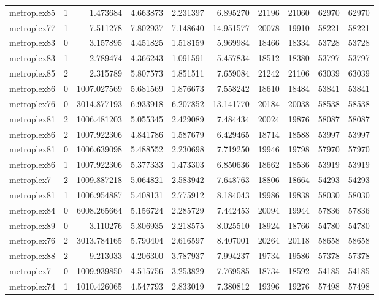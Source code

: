 \begin{longtable}{|l|r|r|r|r|r|r|r|r|r|}
metroplex85 & 1 & 1.473684 & 4.663873 & 2.231397 & 6.895270 & 21196 & 21060 & 62970 & 62970 \\
metroplex77 & 1 & 7.511278 & 7.802937 & 7.148640 & 14.951577 & 20078 & 19910 & 58221 & 58221 \\
metroplex83 & 0 & 3.157895 & 4.451825 & 1.518159 & 5.969984 & 18466 & 18334 & 53728 & 53728 \\
metroplex83 & 1 & 2.789474 & 4.366243 & 1.091591 & 5.457834 & 18512 & 18380 & 53797 & 53797 \\
metroplex85 & 2 & 2.315789 & 5.807573 & 1.851511 & 7.659084 & 21242 & 21106 & 63039 & 63039 \\
metroplex86 & 0 & 1007.027569 & 5.681569 & 1.876673 & 7.558242 & 18610 & 18484 & 53841 & 53841 \\
metroplex76 & 0 & 3014.877193 & 6.933918 & 6.207852 & 13.141770 & 20184 & 20038 & 58538 & 58538 \\
metroplex81 & 2 & 1006.481203 & 5.055345 & 2.429089 & 7.484434 & 20024 & 19876 & 58087 & 58087 \\
metroplex86 & 2 & 1007.922306 & 4.841786 & 1.587679 & 6.429465 & 18714 & 18588 & 53997 & 53997 \\
metroplex81 & 0 & 1006.639098 & 5.488552 & 2.230698 & 7.719250 & 19946 & 19798 & 57970 & 57970 \\
metroplex86 & 1 & 1007.922306 & 5.377333 & 1.473303 & 6.850636 & 18662 & 18536 & 53919 & 53919 \\
metroplex7 & 2 & 1009.887218 & 5.064821 & 2.583942 & 7.648763 & 18806 & 18664 & 54293 & 54293 \\
metroplex81 & 1 & 1006.954887 & 5.408131 & 2.775912 & 8.184043 & 19986 & 19838 & 58030 & 58030 \\
metroplex84 & 0 & 6008.265664 & 5.156724 & 2.285729 & 7.442453 & 20094 & 19944 & 57836 & 57836 \\
metroplex89 & 0 & 3.110276 & 5.806935 & 2.218575 & 8.025510 & 18924 & 18766 & 54780 & 54780 \\
metroplex76 & 2 & 3013.784165 & 5.790404 & 2.616597 & 8.407001 & 20264 & 20118 & 58658 & 58658 \\
metroplex88 & 2 & 9.213033 & 4.206300 & 3.787937 & 7.994237 & 19734 & 19586 & 57378 & 57378 \\
metroplex7 & 0 & 1009.939850 & 4.515756 & 3.253829 & 7.769585 & 18734 & 18592 & 54185 & 54185 \\
metroplex74 & 1 & 1010.426065 & 4.547793 & 2.833019 & 7.380812 & 19396 & 19276 & 57498 & 57498 \\

\end{longtable}

